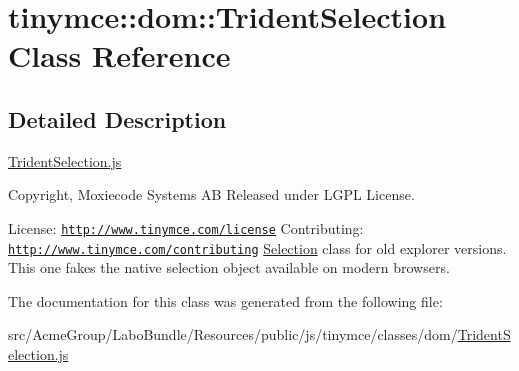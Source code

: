 \hypertarget{classtinymce_1_1dom_1_1_trident_selection}{\section{tinymce\+:\+:dom\+:\+:Trident\+Selection Class Reference}
\label{classtinymce_1_1dom_1_1_trident_selection}
}


\subsection{Detailed Description}
\hyperlink{_trident_selection_8js}{Trident\+Selection.\+js}

Copyright, Moxiecode Systems A\+B Released under L\+G\+P\+L License.

License\+: \href{http://www.tinymce.com/license}{\tt http\+://www.\+tinymce.\+com/license} Contributing\+: \href{http://www.tinymce.com/contributing}{\tt http\+://www.\+tinymce.\+com/contributing} \hyperlink{classtinymce_1_1dom_1_1_selection}{Selection} class for old explorer versions. This one fakes the native selection object available on modern browsers. 

The documentation for this class was generated from the following file\+:\begin{DoxyCompactItemize}
\item 
src/\+Acme\+Group/\+Labo\+Bundle/\+Resources/public/js/tinymce/classes/dom/\hyperlink{_trident_selection_8js}{Trident\+Selection.\+js}\end{DoxyCompactItemize}
